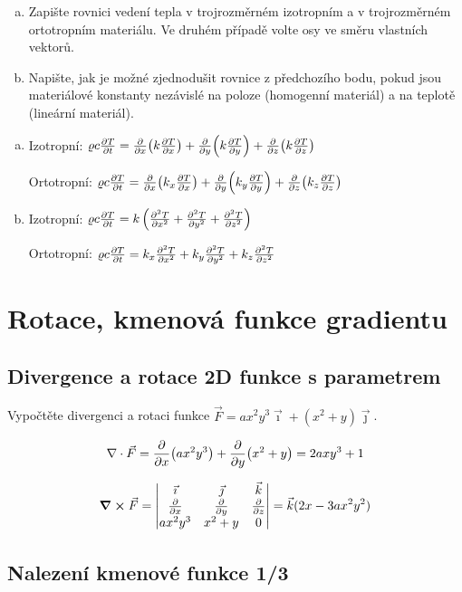 \begin{enumerate}[a)]
\item Zapište rovnici vedení tepla v trojrozměrném izotropním a v
  trojrozměrném ortotropním materiálu. Ve druhém případě volte osy ve
  směru vlastních vektorů.
\item Napište, jak je možné zjednodušit rovnice z předchozího bodu,
  pokud jsou materiálové konstanty nezávislé na poloze (homogenní
  materiál) a na teplotě (lineární materiál).
\end{enumerate}

\reseni
\begin{enumerate}[a)]
\item Izotropní: $\varrho c \pdv{T}{t} = 
\pdv{x}(k\pdv{T}{x})
+\pdv{y}(k\pdv{T}{y})
+\pdv{z}(k\pdv{T}{z})$

  Ortotropní:
 $\varrho c \pdv{T}{t} = 
\pdv{x}(k_x\pdv{T}{x})
+\pdv{y}(k_y\pdv{T}{y})
+\pdv{z}(k_z\pdv{T}{z})
$
\item Izotropní: $\varrho c \pdv{T}{t} = 
k\left(\pdv[2]{T}{x} + \pdv[2]{T}{y} + \pdv[2]{T}{z}\right)
$

  Ortotropní:
 $\varrho c \pdv{T}{t} = 
k_x\pdv[2]{T}{x}
+k_y\pdv[2]{T}{y}
+k_z\pdv[2]{T}{z}
$
\end{enumerate}
\konec

\section{Rotace, kmenová funkce gradientu}

\subsection{Divergence a rotace 2D funkce s parametrem}
Vypočtěte divergenci a rotaci funkce $\vec F=ax^2y^3\vec \imath + (x^2+y)\vec\jmath$.

\reseni

$$\nabla\cdot \vec F=\pdv{x}(ax^2y^3)+\pdv{y}(x^2+y)=2axy^3+1$$

 $$\curl \vec F=
 \begin{vmatrix}
   \vec\imath & \vec \jmath & \vec k\\
   \pdv{x} & \pdv{y} & \pdv{z} \\
   ax^2y^3 & x^2+y & 0
 \end{vmatrix}
 =\vec k(2x-3ax^2y^2)
 $$

\konec


\subsection{Nalezení kmenové funkce 1/3}

